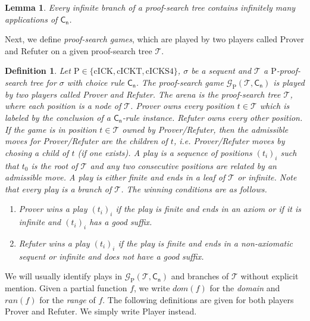 \documentclass{myifcolog}
\newcommand{\hickp}{\mathrm{P}}
\newcommand{\cick}{\mathrm{cICK}}
\newcommand{\cickt}{\mathrm{cICKT}}
\newcommand{\cicks}{\mathrm{cICKS4}}
\newtheorem{definition}[theorem]{Definition}
\newtheorem{lemma}[theorem]{Lemma}
\numberwithin{theorem}{section}
\begin{document}
\begin{lemma}\label{lemma every inf branch inf many C}
    Every infinite branch of a proof-search tree contains infinitely many applications of $\mathsf{C_n}$. 
\end{lemma}


Next, we define \emph{proof-search games}, which are played by two players called Prover and Refuter on a given proof-search tree $\mathcal{T}$.

\begin{definition}\label{d: proof-search tree for iltln}
    Let $\hickp \in \{\cick, \cickt, \cicks\}$, $\sigma$ be a sequent and $\mathcal{T}$ a $\hickp$-proof-search tree for $\sigma$ with choice rule $\mathsf{C_n}$. The \emph{proof-search game} $\mathcal{G}_\hickp(\mathcal{T}, \mathsf{C_n})$ is played by two players called \emph{Prover} and \emph{Refuter}. The \emph{arena} is the proof-search tree $\mathcal{T}$, where each \emph{position} is a node of $\mathcal{T}$. Prover \emph{owns} every position $t \in \mathcal{T}$ which is labeled by the conclusion of a $\mathsf{C_n}$-rule instance. Refuter owns every other position. If the game is in position $t \in \mathcal{T}$ owned by Prover/Refuter, then the \emph{admissible moves} for Prover/Refuter are the children of $t$, i.e. Prover/Refuter moves by chosing a child of $t$ (if one exists). A \emph{play} is a sequence of positions $(t_i)_i$ such that $t_0$ is the root of $\mathcal{T}$ and any two consecutive positions are related by an admissible move. A play is either finite and ends in a leaf of $\mathcal{T}$ or infinite. Note that every play is a branch of $\mathcal{T}$. The \emph{winning conditions} are as follows.
    \begin{enumerate}
        \item Prover wins a play $(t_i)_i$ if the play is finite and ends in an axiom or if it is infinite and $(t_i)_i$ has a good suffix.
        \item Refuter wins a play $(t_i)_i$ if the play is finite and ends in a non-axiomatic sequent or infinite and does not have a good suffix.
    \end{enumerate}
\end{definition}

 We will usually identify plays in $\mathcal{G}_\hickp(\mathcal{T}, \mathsf{C_n})$ and branches of $\mathcal{T}$ without explicit mention. Given a partial function $f$, we write $dom(f)$ for the \emph{domain} and $ran(f)$ for the \emph{range} of $f$. The following definitions are given for both players Prover and Refuter. We simply write Player instead.
\end{document}
